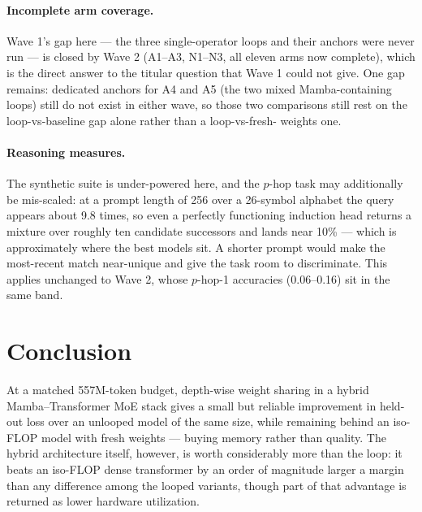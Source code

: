 \documentclass[11pt,a4paper]{article}
\begin{document}
\paragraph{Incomplete arm coverage.} Wave 1's gap here --- the three single-operator loops and their
anchors were never run --- is closed by Wave 2 (A1--A3, N1--N3, all eleven arms now complete), which
is the direct answer to the titular question that Wave 1 could not give. One gap remains: dedicated
anchors for A4 and A5 (the two mixed Mamba-containing loops) still do not exist in either wave, so
those two comparisons still rest on the loop-vs-baseline gap alone rather than a loop-vs-fresh-
weights one.

\paragraph{Reasoning measures.} The synthetic suite is under-powered here, and the $p$-hop task may
additionally be mis-scaled: at a prompt length of 256 over a 26-symbol alphabet the query appears
about 9.8 times, so even a perfectly functioning induction head returns a mixture over roughly ten
candidate successors and lands near 10\% --- which is approximately where the best models sit. A
shorter prompt would make the most-recent match near-unique and give the task room to discriminate.
This applies unchanged to Wave 2, whose $p$-hop-1 accuracies (0.06--0.16) sit in the same band.

\section{Conclusion}

At a matched 557M-token budget, depth-wise weight sharing in a hybrid Mamba--Transformer MoE stack
gives a small but reliable improvement in held-out loss over an unlooped model of the same size,
while remaining behind an iso-FLOP model with fresh weights --- buying memory rather than quality.
The hybrid architecture itself, however, is worth considerably more than the loop: it beats an
iso-FLOP dense transformer by an order of magnitude larger a margin than any difference among the
looped variants, though part of that advantage is returned as lower hardware utilization.
\end{document}
